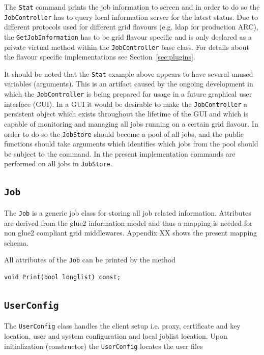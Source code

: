 \documentclass{book}
\newcommand{\JobController}{\texttt{JobController}}
\newcommand{\Job}{\texttt{Job}}
\newcommand{\UserConfig}{\texttt{UserConfig}}
\begin{document}
The \texttt{Stat} command prints the job information to screen and in order to do so the {\JobController} has to query local information
server for the latest status. Due to different protocols used for different grid flavours (e.g. ldap for production ARC), the 
\texttt{GetJobInformation} has to be grid flavour specific and is only declared as a private virtual method within the {\JobController}
base class. For details about the flavour specific implementations see Section~\ref{sec:plugins}.

It should be noted that the \texttt{Stat} example above appears to have several unused variables (arguments). This is an artifact 
caused by the ongoing development in which the {\JobController} is being prepared for usage in a future graphical user interface (GUI).
In a GUI it would be desirable to make the {\JobController} a persistent object which exists throughout the lifetime of the GUI and 
which is capable of monitoring and managing all jobs running on a certain grid flavour. In order to do so the \texttt{JobStore} should 
become a pool of all jobs, and the public functions should take arguments which identifies which jobs from the pool should be subject 
to the command. In the present implementation commands are performed on all jobs in \texttt{JobStore}.

\subsection{{\Job}} The {\Job} is a generic job class for storing all job related information. Attributes are derived from the 
glue2 information model and thus a mapping is needed for non glue2 compliant grid middlewares. Appendix XX shows the present 
mapping schema.

All attributes of the {\Job} can be printed by the method

\begin{shaded}
\begin{verbatim}                                                                                                                            
void Print(bool longlist) const;
\end{verbatim}
\end{shaded}

\subsection{{\UserConfig}} The {\UserConfig} class handles the client setup i.e. proxy, certificate and key location, user and system 
configuration and local joblist location. Upon initialization (constructor) the {\UserConfig} locates the user files
\end{document}
